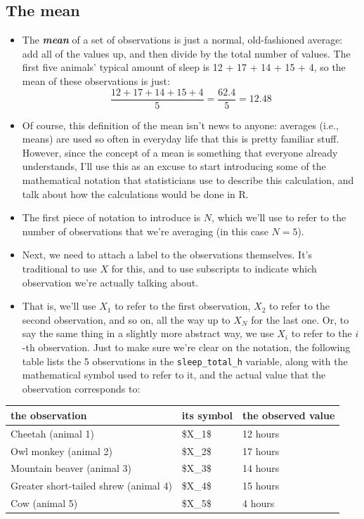 \documentclass[
]{book}
\begin{document}
\subsection{The mean}\label{mean}

\begin{itemize}
\item
  The \textbf{\emph{mean}} of a set of observations is just a normal, old-fashioned average: add all of the values up, and then divide by the total number of values. The first five animals' typical amount of sleep is 12 + 17 + 14 + 15 + 4, so the mean of these observations is just:
  \[
  \frac{12 + 17 + 14 + 15 + 4}{5} = \frac{62.4}{5} = 12.48
  \]
\item
  Of course, this definition of the mean isn't news to anyone: averages (i.e., means) are used so often in everyday life that this is pretty familiar stuff. However, since the concept of a mean is something that everyone already understands, I'll use this as an excuse to start introducing some of the mathematical notation that statisticians use to describe this calculation, and talk about how the calculations would be done in R.
\item
  The first piece of notation to introduce is \(N\), which we'll use to refer to the number of observations that we're averaging (in this case \(N = 5\)).
\item
  Next, we need to attach a label to the observations themselves. It's traditional to use \(X\) for this, and to use subscripts to indicate which observation we're actually talking about.
\item
  That is, we'll use \(X_1\) to refer to the first observation, \(X_2\) to refer to the second observation, and so on, all the way up to \(X_N\) for the last one. Or, to say the same thing in a slightly more abstract way, we use \(X_i\) to refer to the \(i\)-th observation. Just to make sure we're clear on the notation, the following table lists the 5 observations in the \texttt{sleep\_total\_h} variable, along with the mathematical symbol used to refer to it, and the actual value that the observation corresponds to:
\end{itemize}

\begin{tabular}{lll}
\toprule
the observation & its symbol & the observed value\\
\midrule
Cheetah (animal 1) & \$X\_1\$ & 12 hours\\
Owl monkey (animal 2) & \$X\_2\$ & 17 hours\\
Mountain beaver (animal 3) & \$X\_3\$ & 14 hours\\
Greater short-tailed shrew (animal 4) & \$X\_4\$ & 15 hours\\
Cow (animal 5) & \$X\_5\$ & 4 hours\\
\bottomrule
\end{tabular}
\end{document}
